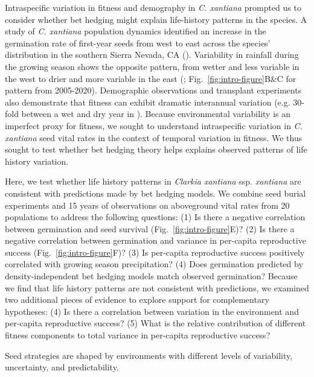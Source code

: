 \documentclass[12pt, oneside, titlepage]{article}   	%
\begin{document}
Intraspecific variation in fitness and demography in \textit{C. xantiana} prompted us to consider whether bet hedging might explain life-history patterns in the species. A study of \textit{C. xantiana} population dynamics identified an increase in the germination rate of first-year seeds from west to east across the species' distribution in the southern Sierra Nevada, CA (\cite{eckhart2011}). Variability in rainfall during the growing season shows the opposite pattern, from wetter and less variable in the west to drier and more variable in the east (\cite{eckhart2011}; Fig.~\ref{fig:intro-figure}B\&C for pattern from 2005-2020). Demographic observations \cite{eckhart2011} and transplant experiments also demonstrate that fitness can exhibit dramatic interannual variation (e.g. 30-fold between a wet and dry year in \cite{geber2005}). Because environmental variability is an imperfect proxy for fitness, we sought to understand intraspecific variation in \textit{C. xantiana} seed vital rates in the context of temporal variation in fitness. We thus sought to test whether bet hedging theory helps explains observed patterns of life history variation.
 
Here, we test whether life history patterns in \textit{Clarkia xantiana} ssp. \textit{xantiana} are consistent with predictions made by bet hedging models. We combine seed burial experiments and 15 years of observations on aboveground vital rates from 20 populations to address the following questions: (1) Is there a negative correlation between germination and seed survival (Fig.~\ref{fig:intro-figure}E)? (2) Is there a negative correlation between germination and variance in per-capita reproductive success (Fig.~\ref{fig:intro-figure}F)? (3)  Is per-capita reproductive success positively correlated with growing season precipitation? (4) Does germination predicted by density-independent bet hedging models match observed germination? Because we find that life history patterns are not consistent with predictions, we examined two additional pieces of evidence to explore support for complementary hypotheses: (4) Is there a correlation between variation in the environment and per-capita reproductive success? (5) What is the relative contribution of different fitness components to total variance in per-capita reproductive success? %

\iffalse
Seed strategies are shaped by environments with different levels of variability, uncertainty, and predictability. 
\end{document}
